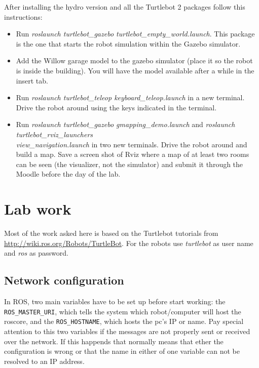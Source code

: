 \documentclass[a4paper,10pt]{article}
\begin{document}
After installing the hydro version and all the Turtlebot 2 packages follow this instructions:
\begin{itemize}
	\item Run \textit{roslaunch turtlebot\_gazebo turtlebot\_empty\_world.launch}. This package is the one that starts the robot simulation within the Gazebo simulator.
	\item Add the Willow garage model to the gazebo simulator (place it so the robot is inside the building). You will have the model available after a while in the insert tab.
	\item Run \textit{roslaunch turtlebot\_teleop keyboard\_teleop.launch} in a new terminal. Drive the robot around using the keys indicated in the terminal.
	\item Run \textit{roslaunch turtlebot\_gazebo gmapping\_demo.launch} and \textit{roslaunch turtlebot\_rviz\_launchers \\ view\_navigation.launch} in two new terminals. Drive the robot around and build a map. Save a screen shot of Rviz where a map of at least two rooms can be seen (the visualizer, not the simulator) and submit it through the Moodle before the day of the lab.
\end{itemize}

\section{Lab work}
Most of the work asked here is based on the Turtlebot tutorials from \url{http://wiki.ros.org/Robots/TurtleBot}. For the robots use \textit{turtlebot} as user name and \textit{ros} as password.

\subsection{Network configuration}
In ROS, two main variables have to be set up before start working: the \texttt{ROS\_MASTER\_URI}, which tells the system which robot/computer will host the roscore, and the \texttt{ROS\_HOSTNAME}, which hosts the pc's IP or name. Pay special attention to this two variables if the messages are not properly sent or received over the network. If this happends that normally means that ether the configuration is wrong or that the name in either of one variable can not be resolved to an IP address.
\end{document}
